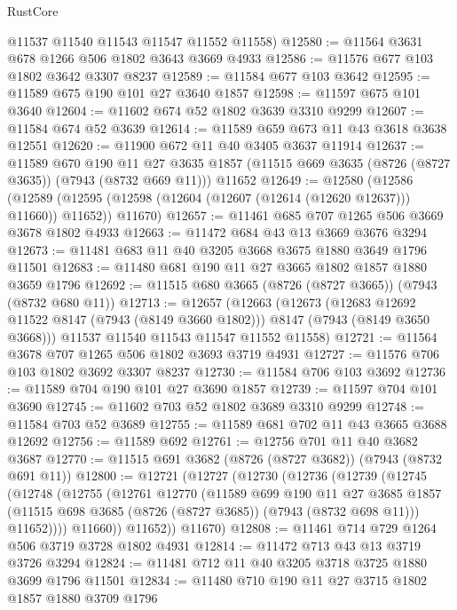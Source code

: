 \begin{lexlean}{RustCore}
\begin{coremodule}
      @11537
      @11540
      @11543
      @11547
      @11552
      @11558)
@12580 := @11564 @3631 @678 @1266 @506 @1802 @3643 @3669 @4933
@12586 := @11576 @677 @103 @1802 @3642 @3307 @8237
@12589 := @11584 @677 @103 @3642
@12595 := @11589 @675 @190 @101 @27 @3640 @1857
@12598 := @11597 @675 @101 @3640
@12604 := @11602 @674 @52 @1802 @3639 @3310 @9299
@12607 := @11584 @674 @52 @3639
@12614 := @11589 @659 @673 @11 @43 @3618 @3638 @12551
@12620 := @11900 @672 @11 @40 @3405 @3637 @11914
@12637 := @11589
    @670
    @190
    @11
    @27
    @3635
    @1857
    (@11515 @669 @3635 (@8726 (@8727 @3635)) (@7943 (@8732 @669 @11)))
    @11652
@12649 := @12580
    (@12586
      (@12589 (@12595 (@12598 (@12604 (@12607 (@12614 (@12620 @12637))) @11660)) @11652))
      @11670)
@12657 := @11461 @685 @707 @1265 @506 @3669 @3678 @1802 @4933
@12663 := @11472 @684 @43 @13 @3669 @3676 @3294
@12673 := @11481 @683 @11 @40 @3205 @3668 @3675 @1880 @3649 @1796 @11501
@12683 := @11480 @681 @190 @11 @27 @3665 @1802 @1857 @1880 @3659 @1796
@12692 := @11515 @680 @3665 (@8726 (@8727 @3665)) (@7943 (@8732 @680 @11))
@12713 := @12657
    (@12663
      (@12673
        (@12683 @12692 @11522 @8147 (@7943 (@8149 @3660 @1802)))
        @8147
        (@7943 (@8149 @3650 @3668)))
      @11537
      @11540
      @11543
      @11547
      @11552
      @11558)
@12721 := @11564 @3678 @707 @1265 @506 @1802 @3693 @3719 @4931
@12727 := @11576 @706 @103 @1802 @3692 @3307 @8237
@12730 := @11584 @706 @103 @3692
@12736 := @11589 @704 @190 @101 @27 @3690 @1857
@12739 := @11597 @704 @101 @3690
@12745 := @11602 @703 @52 @1802 @3689 @3310 @9299
@12748 := @11584 @703 @52 @3689
@12755 := @11589 @681 @702 @11 @43 @3665 @3688 @12692
@12756 := @11589 @692
@12761 := @12756 @701 @11 @40 @3682 @3687
@12770 := @11515 @691 @3682 (@8726 (@8727 @3682)) (@7943 (@8732 @691 @11))
@12800 := @12721
    (@12727
      (@12730
        (@12736
          (@12739
            (@12745
              (@12748
                (@12755
                  (@12761
                    @12770
                    (@11589
                      @699
                      @190
                      @11
                      @27
                      @3685
                      @1857
                      (@11515 @698 @3685 (@8726 (@8727 @3685)) (@7943 (@8732 @698 @11)))
                      @11652))))
              @11660))
          @11652))
      @11670)
@12808 := @11461 @714 @729 @1264 @506 @3719 @3728 @1802 @4931
@12814 := @11472 @713 @43 @13 @3719 @3726 @3294
@12824 := @11481 @712 @11 @40 @3205 @3718 @3725 @1880 @3699 @1796 @11501
@12834 := @11480 @710 @190 @11 @27 @3715 @1802 @1857 @1880 @3709 @1796

\end{coremodule}
\end{lexlean}
